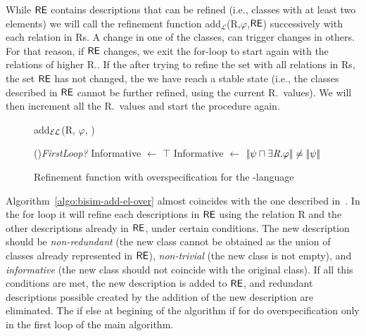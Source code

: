 While $\textsf{RE}$ contains descriptions that can be refined (i.e., classes with at least two elements) we will call the refinement function add$_\mathcal{L}$(R,$\varphi$,$\textsf{RE}$) successively with each relation in Rs. A change in one of the classes, can trigger changes in others. For that reason, if $\textsf{RE}$ changes, we exit the for-loop to start again with the relations of higher R.\puse. If the after trying to refine the set with all relations in Rs, the set $\textsf{RE}$ has not changed, the we have reach a stable state (i.e., the classes described in $\textsf{RE}$ cannot be further refined, using the current R.\puse\ values). We will then increment all the R.\puse\ values and start the procedure again. 

\begin{figure}[t]
\small
\centering
\begin{algorithm}[H]
\dontprintsemicolon
\caption{add$_\mathcal{EL}$(R, $\varphi$, \RE)} \label{algo:bisim-add-el-over}

\eIf(){\em FirstLoop?}{
    Informative $\leftarrow$ $\top$ }{
    Informative $\leftarrow$ $|\!|\psi \sqcap \exists \mbox{\em R}.\varphi|\!| \neq |\!|\psi|\!|$ }
\end{algorithm}
\vspace*{-.5cm}\caption{Refinement function with overspecification for the \el-language}\label{fig:algo3}
\end{figure}


Algorithm~\ref{algo:bisim-add-el-over} almost coincides with the one described in~\cite{arec2:2008:Areces}.  In the for loop it will refine each descriptions in $\textsf{RE}$ using the relation R and the other descriptions already in $\textsf{RE}$, under certain conditions. The new description should be \emph{non-redundant} (the new  class cannot be obtained as the union of classes already represented in $\textsf{RE}$), \emph{non-trivial} (the new class is not empty), and \emph{informative} (the new class should not coincide with the original class).  If all this conditions are met, the new description is added to $\textsf{RE}$, and redundant descriptions possible created by the addition of the new description are eliminated. The if else at begining of the algorithm if for do overspecification only in the first loop of the main algorithm.   

